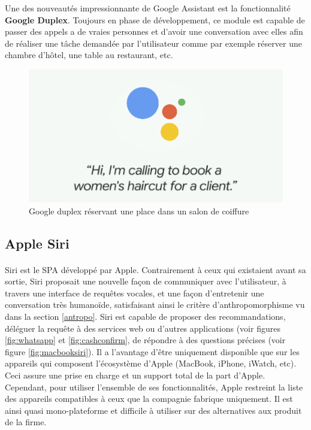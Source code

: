 \par Une des nouveautés impressionnante de Google Assistant est la fonctionnalité \textbf{Google Duplex}. Toujours en phase de développement, ce module est capable de passer des appels a de vraies personnes et d'avoir une conversation avec elles afin de réaliser une tâche demandée par l'utilisateur comme par exemple réserver une chambre d'hôtel, une table au restaurant, etc. 
\begin{figure}[H]
	\centering
	\includegraphics[width=.5\linewidth]{images/google_assitant/duplex.png} 
	\caption{Google duplex réservant une place dans un salon de coiffure} 
\end{figure}


\subsection{Apple Siri}\label{siri}
\paragraph{}
Siri est le SPA développé par Apple. Contrairement à ceux qui existaient avant sa sortie, Siri proposait une nouvelle façon de communiquer avec l'utilisateur, à travers une interface de requêtes vocales, et une façon d'entretenir une conversation très humanoïde, satisfaisant ainsi le critère d'anthropomorphisme vu dans la section \ref{antropo}.
Siri est capable de proposer des recommandations, déléguer la requête à des services web ou d'autres applications (voir figures \ref{fig:whatsapp} et \ref{fig:cashconfirm}, de répondre à des questions précises (voir figure \ref{fig:macbooksiri}). Il a l'avantage d'être uniquement disponible que sur les appareils qui composent l'écosystème d'Apple (MacBook, iPhone, iWatch, etc). Ceci assure une prise en charge et un support total de la part d'Apple. Cependant, pour utiliser l'ensemble de ses fonctionnalités, Apple restreint la liste des appareils compatibles à ceux que la compagnie fabrique uniquement. Il est ainsi quasi mono-plateforme et difficile à utiliser sur des alternatives aux produit de la firme.

